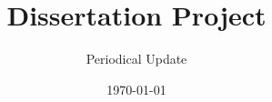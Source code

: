 \title{Dissertation Project}
\subtitle{Periodical Update}
\titlegraphic{}
\date{\today}
\begin{frame}[plain]
  \titlepage
\end{frame}